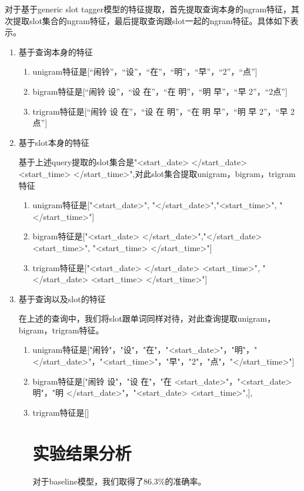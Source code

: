 \documentclass[master]{njuthesis}
\begin{document}
\begin{enumerate}
   
    对于基于generic slot tagger模型的特征提取，首先提取查询本身的ngram特征，其次提取slot集合的ngram特征，最后提取查询跟slot一起的ngram特征。具体如下表示。
\begin{enumerate}
  \item 基于查询本身的特征
    \begin{enumerate}
      \item unigram特征是[“闹铃”，“设”，“在”，“明”，“早”，“2”，“点”]
      \item bigram特征是[“闹铃 设”，“设 在”，“在 明”，“明 早”，“早 2”，“2点”]
      \item trigram特征是[“闹铃 设 在”，“设 在 明”，“在 明 早”，“明 早 2”，“早 2 点”]
    \end{enumerate}
  \item 基于slot本身的特征
    
   基于上述query提取的slot集合是"<start\_date> </start\_date> <start\_time> </start\_time>",对此slot集合提取unigram，bigram，trigram特征
    \begin{enumerate}
      \item unigram特征是["<start\_date>", "</start\_date>","<start\_time>", "</start\_time>"]
      \item bigram特征是["<start\_date> </start\_date>","</start\_date> <start\_time>", "<start\_time> </start\_time>"]
      \item trigram特征是["<start\_date> </start\_date> <start\_time>", "</start\_date> <start\_time> </start\_time>"]
    \end{enumerate} 
  \item 基于查询以及slot的特征
   
   在上述的查询中，我们将slot跟单词同样对待，对此查询提取unigram，bigram，trigram特征。
   \begin{enumerate}
     \item unigram特征是["闹铃"，"设"，"在"，"<start\_date>"，"明"，"</start\_date>"，"<start\_time>"，"早"，"2"，"点"，"</start\_time>"]
     \item bigram特征是["闹铃 设"，"设 在"，"在 <start\_date>"，"<start\_date> 明"，"明 </start\_date>"，"<start\_date> <start\_time>",],
     \item trigram特征是[]

\section{实验结果分析}

    对于baseline模型，我们取得了86.3\%的准确率。
    

\end{enumerate}
\end{enumerate}
\end{enumerate}
\end{document}
